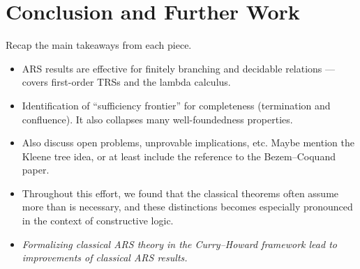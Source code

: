 \section{Conclusion and Further Work}
\label{sec:Conclusion}

Recap the main takeaways from each piece.
\begin{itemize}
  \item ARS results are effective for finitely branching and decidable relations
  --- covers first-order TRSs and the lambda calculus.
  \item Identification of ``sufficiency frontier'' for completeness (termination and confluence).
  It also collapses many well-foundedness properties.
  \item Also discuss open problems, unprovable implications, etc.
  Maybe mention the Kleene tree idea, or at least include the reference to the Bezem--Coquand paper.
  \item Throughout this effort, we found that the classical theorems often assume
  more than is necessary, and these distinctions becomes especially pronounced
  in the context of constructive logic.
  \item \emph{Formalizing classical ARS theory in the Curry--Howard framework
  lead to improvements of classical ARS results.}
\end{itemize}
